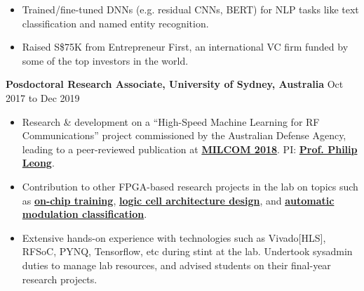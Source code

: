 \documentclass[10pt]{article}
\newenvironment{myinnerlist}[1][\enskip\textbullet]%
        {\begin{itemize}[#1,leftmargin=*,parsep=0pt,itemsep=3pt,topsep=0pt,partopsep=0pt]}
        {\end{itemize}\vspace{.6\baselineskip}}
\newcommand{\localtextbulletone}{\textcolor{gray}{\raisebox{.45ex}{\rule{.8ex}{.8ex}}}}
\begin{document}
{\begin{minipage}[t]{\textwidth+\marginparwidth+\marginparsep}
\begin{myinnerlist}
            \item Trained/fine-tuned DNNs (e.g. residual CNNs, BERT) for NLP
                tasks like text classification and named entity recognition.

            \item Raised S\$75K from Entrepreneur First, an international VC
                firm funded by some of the top investors in the world.

        \end{myinnerlist}

        \textbf{Posdoctoral Research Associate, University of Sydney, Australia} \hfill {Oct 2017 to Dec 2019}

        \vspace{0.1in}
        \begin{myinnerlist}
            \renewcommand{\labelitemi}{\localtextbulletone}

            \item Research \& development on a ``High-Speed Machine Learning
                for RF Communications'' project commissioned by the Australian
                Defense Agency, leading to a peer-reviewed publication at
                \href{https://ieeexplore.ieee.org/document/8599833}{\bf MILCOM
                2018}. PI:
                \href{https://www.sydney.edu.au/engineering/about/our-people/academic-staff/philip-leong.html}{\bf
                Prof. Philip Leong}.
            \item Contribution to other FPGA-based research projects in the lab on
                topics such as
                \href{https://ieeexplore.ieee.org/document/8742277}{\bf on-chip
                training},
                \href{https://dl.acm.org/doi/abs/10.1145/3373087.3375303}{\bf logic
                cell architecture design}, and
                \href{https://ieeexplore.ieee.org/abstract/document/9150443}{\bf automatic
                modulation classification}.
            \item Extensive hands-on experience with technologies such as
                Vivado[HLS], RFSoC, PYNQ, Tensorflow, etc during stint at the
                lab. Undertook sysadmin duties to manage lab resources, and
                advised students on their final-year research projects.

        \end{myinnerlist}
        \vspace{-0.15in}
    \end{minipage}
}\\[.15\baselineskip]
\end{document}
